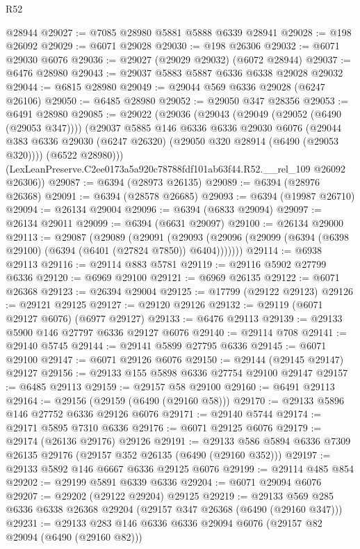 \begin{lexlean}{R52}
\begin{coremodule}
    @28944
@29027 := @7085 @28980 @5881 @5888 @6339 @28941
@29028 := @198 @26092
@29029 := @6071 @29028
@29030 := @198 @26306
@29032 := @6071 @29030 @6076
@29036 := @29027 (@29029 @29032) (@6072 @28944)
@29037 := @6476 @28980
@29043 := @29037 @5883 @5887 @6336 @6338 @29028 @29032
@29044 := @6815 @28980
@29049 := @29044 @569 @6336 @29028 (@6247 @26106)
@29050 := @6485 @28980
@29052 := @29050 @347 @28356
@29053 := @6491 @28980
@29085 := @29022
    (@29036
      (@29043
        (@29049 (@29052 (@6490 (@29053 @347))))
        (@29037
          @5885
          @146
          @6336
          @6336
          @29030
          @6076
          (@29044 @383 @6336 @29030 (@6247 @26320) (@29050 @320 @28914 (@6490 (@29053 @320))))
          (@6522 @28980)))
      (LexLeanPreserve.C2ee0173a5a920c78788fdf101ab63f44.R52.__rel_109 @26092 @26306))
@29087 := @6394 (@28973 @26135)
@29089 := @6394 (@28976 @26368)
@29091 := @6394 (@28578 @26685)
@29093 := @6394 (@19987 @26710)
@29094 := @26134 @29004
@29096 := @6394 (@6833 @29094)
@29097 := @26134 @29011
@29099 := @6394 (@6631 @29097)
@29100 := @26134 @29000
@29113 := @29087
    (@29089
      (@29091
        (@29093 (@29096 (@29099 (@6394 (@6398 @29100) (@6394 (@6401 (@27824 @7850)) @6404)))))))
@29114 := @6938 @29113
@29116 := @29114 @883 @5781
@29119 := @29116 @5902 @27799 @6336
@29120 := @6969 @29100
@29121 := @6969 @26135
@29122 := @6071 @26368
@29123 := @26394 @29004
@29125 := @17799 (@29122 @29123)
@29126 := @29121 @29125
@29127 := @29120 @29126
@29132 := @29119 (@6071 @29127 @6076) (@6977 @29127)
@29133 := @6476 @29113
@29139 := @29133 @5900 @146 @27797 @6336 @29127 @6076
@29140 := @29114 @708
@29141 := @29140 @5745
@29144 := @29141 @5899 @27795 @6336
@29145 := @6071 @29100
@29147 := @6071 @29126 @6076
@29150 := @29144 (@29145 @29147) @29127
@29156 := @29133 @155 @5898 @6336 @27754 @29100 @29147
@29157 := @6485 @29113
@29159 := @29157 @58 @29100
@29160 := @6491 @29113
@29164 := @29156 (@29159 (@6490 (@29160 @58)))
@29170 := @29133 @5896 @146 @27752 @6336 @29126 @6076
@29171 := @29140 @5744
@29174 := @29171 @5895 @7310 @6336
@29176 := @6071 @29125 @6076
@29179 := @29174 (@26136 @29176) @29126
@29191 := @29133 @586 @5894 @6336 @7309 @26135 @29176 (@29157 @352 @26135 (@6490 (@29160 @352)))
@29197 := @29133 @5892 @146 @6667 @6336 @29125 @6076
@29199 := @29114 @485 @854
@29202 := @29199 @5891 @6339 @6336
@29204 := @6071 @29094 @6076
@29207 := @29202 (@29122 @29204) @29125
@29219 := @29133 @569 @285 @6336 @6338 @26368 @29204 (@29157 @347 @26368 (@6490 (@29160 @347)))
@29231 := @29133 @283 @146 @6336 @6336 @29094 @6076 (@29157 @82 @29094 (@6490 (@29160 @82)))

\end{coremodule}
\end{lexlean}
